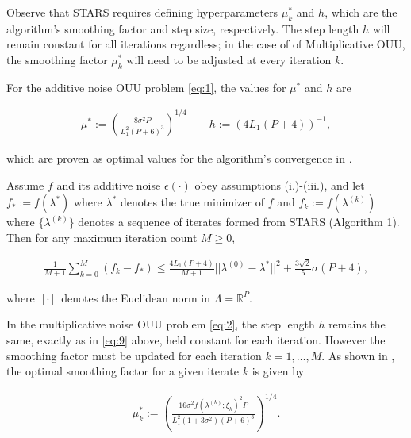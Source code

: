 \documentclass{amsart}
\newcommand{\R}{\mathbb{R}}
\begin{document}
\vspace{.25cm}

\noindent Observe that STARS requires defining hyperparameters $\mu^*_k$ and $h$, which are the algorithm's smoothing factor and step size, respectively. The step length $h$ will remain constant for all iterations regardless; in the case of of  Multiplicative OUU, 
the smoothing factor $\mu^*_k$ will need to be adjusted at every iteration $k$.  

For the additive noise OUU problem \eqref{eq:1}, the values for $\mu^*$ and $h$ are 

\begin{eqnarray} \label{eq:9}
\mu^*:=\left( \frac{8\sigma^2 P}{L_1^2(P+6)^3}\right)^{1/4} \quad \quad h:=(4L_1(P+4))^{-1},
\end{eqnarray} 

\noindent which are proven as optimal values for the algorithm's convergence in \cite{CW}. 

Assume $f$ and its additive noise $\epsilon(\cdot)$ obey assumptions (i.)-(iii.), and let $f_*:=f(\lambda^*)$ where $\lambda^*$ denotes the true minimizer of $f$ and $f_k:=f(\lambda^{(k)})$ where $\{\lambda^{(k)}\}$ denotes a sequence of iterates formed from STARS (Algorithm 1). Then for any maximum iteration count $M \geq 0$,

\begin{eqnarray} \label{eq:10}
\frac{1}{M+1} \sum_{k=0}^M (f_k-f_*) \leq \frac{4L_1(P+4)}{M+1}||\lambda^{(0)}-\lambda^*||^2 + \frac{3 \sqrt{2}}{5} \sigma (P+4),
\end{eqnarray} 

\noindent where $||\cdot||$ denotes the Euclidean norm in $\Lambda= \R^P$.

In the multiplicative noise OUU problem \eqref{eq:2}, the step length $h$ remains the same, exactly as in \eqref{eq:9} above, held constant for each iteration. However the smoothing factor must be updated for each iteration $k=1,\ldots, M.$ As shown in \cite{CW}, the optimal smoothing factor for a given iterate $k$ is given by

\begin{eqnarray} \label{eq:11}
\mu^*_k:=\left( \frac{16 \sigma^2 f(\lambda^{(k)};\xi_k)^2 P}{L_1^2(1+3\sigma^2)(P+6)^3}\right)^{1/4}.
\end{eqnarray} 
\end{document}

